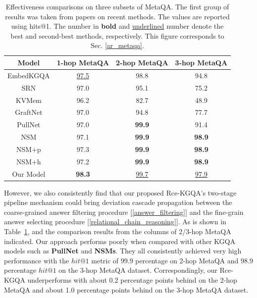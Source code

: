 \documentclass[pdflatex,sn-mathphys]{sn-jnl}%
\theoremstyle{thmstyleone}%
\theoremstyle{thmstyletwo}%
\theoremstyle{thmstylethree}%
\begin{document}
\begin{table}[h]
    \centering
    \begin{tabular}{c|ccc} \hline
        Model & 1-hop MetaQA & 2-hop MetaQA & 3-hop MetaQA\\ \hline
        EmbedKGQA & \underline{97.5} & 98.8 & 94.8 \\
        SRN & 97.0 & 95.1 & 75.2 \\
        KVMem & 96.2 & 82.7 & 48.9 \\
        GraftNet & 97.0 & 94.8 & 77.7 \\
        PullNet & 97.0 & \bf{99.9} & 91.4 \\ \hline
        \textcolor[rgb]{1,0,0}{NSM} & 97.1 & \bf{99.9} & \bf{98.9} \\ 
        \textcolor[rgb]{1,0,0}{NSM+p} & 97.3 & \bf{99.9} & \bf{98.9} \\ 
        \textcolor[rgb]{1,0,0}{NSM+h} & 97.2 & \bf{99.9} & \bf{98.9} \\ \hline
        Our Model  & \bf{98.3} & \underline{99.7} & \underline{97.9} \\ \hline
    \end{tabular}
    \caption{Effectiveness comparisons on three subsets of MetaQA. The first group of results was taken from papers on recent methods. The values are reported using hits@1. The number in \textbf{bold} and \underline{underlined} number denote the best and second-best methods, respectively. This figure corresponds to Sec. \ref{ar_metaqa}.}
    \label{comparison_sota_metaqa}
\end{table}

\textcolor[rgb]{1,0,0}{
However, we also consistently find that our proposed Rce-KGQA's two-stage pipeline mechanism could bring deviation cascade propagation between the coarse-grained answer filtering procedure [\ref{answer_filtering}] and the fine-grain answer selecting procedure [\ref{relational_chain_reasoning}]. As is shown in Table~\ref{comparison_sota_metaqa}, and the comparison results from the columns of 2/3-hop MetaQA indicated. Our approach performs poorly when compared with other KGQA models such as \textbf{PullNet} and \textbf{NSMs}. They all consistently achieved very high performance with the $hit@1$ metric of 99.9 percentage on 2-hop MetaQA and 98.9 percentage $hit@1$ on the 3-hop MetaQA dataset. Correspondingly, our Rce-KGQA underperforms with about 0.2 percentage points behind on the 2-hop MetaQA and about 1.0 percentage points behind on the 3-hop MetaQA dataset.} %
\end{document}
